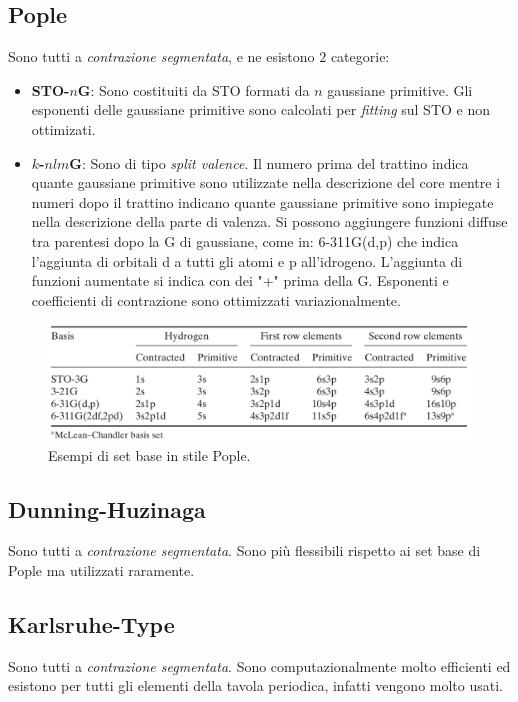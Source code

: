 \documentclass[oneside]{amsbook}
\numberwithin{section}{chapter}
\numberwithin{equation}{section}
\numberwithin{figure}{section}
\begin{document}
\subsection{Pople }
Sono tutti a \emph{contrazione segmentata}, e ne esistono $2$ categorie:
\begin{itemize}
\item \textbf{STO-$n$G}: Sono costituiti da STO formati da $n$ gaussiane primitive. Gli esponenti delle gaussiane primitive sono calcolati per \emph{fitting} sul STO e non ottimizati.
\item \textbf{$k$-$nlm$G}: Sono di tipo \emph{split valence}. Il numero prima del trattino indica quante gaussiane primitive sono utilizzate nella descrizione del core mentre i numeri dopo il trattino indicano quante gaussiane primitive sono impiegate nella descrizione della parte di valenza.
Si possono aggiungere funzioni diffuse tra parentesi dopo la G di gaussiane, come in: 6-311G(d,p) che indica l'aggiunta di orbitali d a tutti gli atomi e p all'idrogeno. L'aggiunta di funzioni aumentate si indica con dei "+" prima della G.
Esponenti e coefficienti di contrazione sono ottimizzati variazionalmente.
\end{itemize}

\begin{figure}[H]
\centering
\caption{Esempi di set base in stile Pople.}\label{popopo}
\includegraphics[scale=0.3]{pop}
\end{figure}


\subsection{Dunning-Huzinaga}
Sono tutti a \emph{contrazione segmentata}. Sono più flessibili rispetto ai set base di Pople ma utilizzati raramente.

\subsection{Karlsruhe-Type}
Sono tutti a \emph{contrazione segmentata}.
Sono computazionalmente molto efficienti ed esistono per tutti gli elementi della tavola periodica, infatti vengono molto usati.
\end{document}
